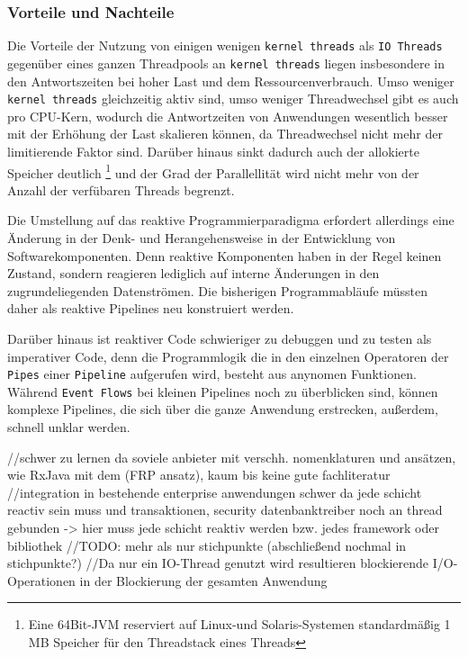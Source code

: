 \subsubsection{Vorteile und Nachteile}
\label{section:vorteile_nachteile}

Die Vorteile der Nutzung von einigen wenigen \verb|kernel threads| als \verb|IO Threads| gegenüber eines ganzen Threadpools
an \verb|kernel threads| liegen insbesondere in den Antwortszeiten bei hoher Last und dem Ressourcenverbrauch.
Umso weniger \verb|kernel threads| gleichzeitig aktiv sind, umso weniger Threadwechsel gibt es auch pro CPU-Kern, wodurch die Antwortzeiten von Anwendungen
wesentlich besser mit der Erhöhung der Last skalieren können, da Threadwechsel nicht mehr der limitierende Faktor sind.
Darüber hinaus sinkt dadurch auch der allokierte Speicher deutlich
\footnote{Eine 64Bit-JVM reserviert auf Linux-und Solaris-Systemen standardmäßig 1 MB Speicher für den Threadstack eines Threads}
und der Grad der Parallellität wird nicht mehr von der Anzahl der verfübaren Threads begrenzt.

Die Umstellung auf das reaktive Programmierparadigma erfordert allerdings eine Änderung in der Denk- und Herangehensweise in der
Entwicklung von Softwarekomponenten. Denn reaktive Komponenten haben in der Regel keinen Zustand,
sondern reagieren lediglich auf interne Änderungen in den zugrundeliegenden Datenströmen.
Die bisherigen Programmabläufe müssten daher als reaktive Pipelines neu konstruiert werden.

Darüber hinaus ist reaktiver Code schwieriger zu debuggen und zu testen als imperativer Code, denn die Programmlogik die in den einzelnen Operatoren
der \verb|Pipes| einer \verb|Pipeline| aufgerufen wird, besteht aus anynomen Funktionen.
Während \verb|Event Flows| bei kleinen Pipelines noch zu überblicken sind, können komplexe Pipelines, die sich über die ganze Anwendung erstrecken,
außerdem, schnell unklar werden.

//schwer zu lernen da soviele anbieter mit verschh. nomenklaturen und ansätzen, wie RxJava mit dem (FRP ansatz), kaum bis keine gute fachliteratur
//integration in bestehende enterprise anwendungen schwer da jede schicht reactiv sein muss und transaktionen, security datenbanktreiber noch an
thread gebunden -> hier muss jede schicht reaktiv werden bzw. jedes framework oder bibliothek
//TODO: mehr als nur stichpunkte (abschließend nochmal in stichpunkte?)
//Da nur ein IO-Thread genutzt wird resultieren blockierende I/O-Operationen in der Blockierung der gesamten Anwendung

